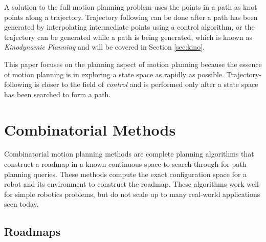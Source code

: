 \documentclass[10pt,conference]{ieeeconf}
\begin{document}
A solution to the full motion planning problem uses the points in a path as knot points along a trajectory. Trajectory following can be done after a path has been generated by interpolating intermediate points using a control algorithm, or the trajectory can be generated while a path is being generated, which is known as \emph{Kinodynamic Planning} and will be covered in Section \ref{sec:kino}. 


This paper focuses on the planning aspect of motion planning because the essence of motion planning is in exploring a state space as rapidly as possible. Trajectory-following  is closer to the field of \emph{control} and is performed only after a state space has been searched to form a path. 



\section{Combinatorial Methods} \label{sec:comb}
	
	Combinatorial motion planning methods are complete planning algorithms that construct a roadmap in a known continuous space to search through for path planning queries. These methods compute the exact configuration space for a robot and its environment to construct the roadmap. These algorithms work well for simple robotics problems, but do not scale up to many real-world applications seen today. 
	
\subsection{Roadmaps}
	
\end{document}
